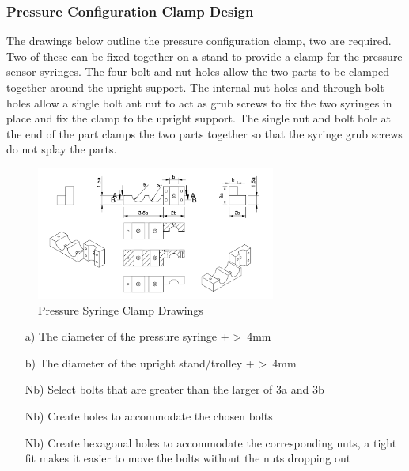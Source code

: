 \subsubsection{Pressure Configuration Clamp Design}

The drawings below outline the pressure configuration clamp, two are required. Two of these can be fixed together on a stand to provide a clamp for the pressure sensor syringes. 
The four bolt and nut holes allow the two parts to be clamped together around the upright support. The internal nut holes and through bolt holes allow a single bolt ant nut to act as grub screws to fix the two syringes in place and fix the clamp to the upright support. The single nut and bolt hole  at the end of the part clamps the two parts together so that the syringe grub screws do not splay the parts. 


\begin{figure}[h]
    \centering
    \includegraphics[width=0.7\textwidth]{Figures/SupportDrawings/pressure_conf_clamp_drawing.png}
    \caption{Pressure Syringe Clamp Drawings}
    \label{fig:pressuresyringeclampdrawing}
  \end{figure}


\begin{enumerate}
  \item[a)] The diameter of the pressure syringe + \textgreater\ 4mm
  \item[b)] The diameter of the upright stand/trolley + \textgreater\ 4mm
  \item[Nb)] Select bolts that are greater than the larger of 3a and 3b
  \item[Nb)] Create holes to accommodate the chosen bolts
  \item[Nb)] Create hexagonal holes to accommodate the corresponding nuts, a tight fit makes it easier to move the bolts without the nuts dropping out
\end{enumerate}

